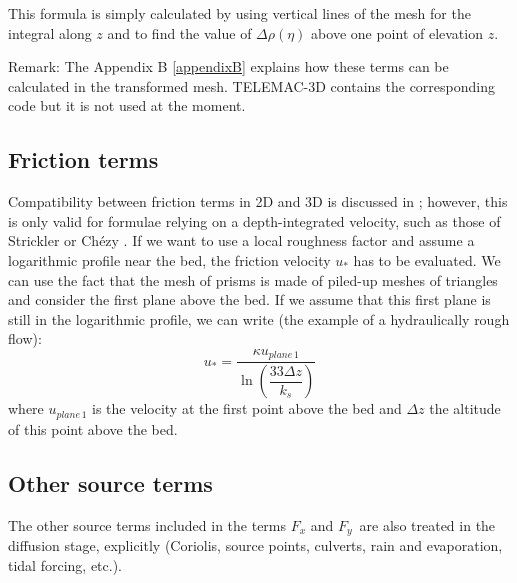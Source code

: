 This formula is simply calculated by using vertical lines of the mesh for the
integral along $z$ and to find the value of $\Delta\rho(\eta)$ above one point
of elevation $z$.

\begin{CommentBlock}{Remark:}
The Appendix B \ref{appendixB}
explains how these terms can be calculated in
the transformed mesh. TELEMAC-3D contains the corresponding code but it is not
used at the moment.
\end{CommentBlock}

\subsection{\label{friction3D}Friction terms%
%
}
Compatibility between friction terms in 2D and 3D is discussed in
\cite{hervouet007}; however, this is only valid for formulae relying on a
depth-integrated velocity, such as those of Strickler%
or Ch\'{e}zy%
%
. If we want to use a local roughness factor and assume a logarithmic profile
near the bed, the friction velocity $u_{\ast}$ has to be evaluated. We can
use the fact that the mesh of prisms is made of piled-up meshes of triangles
and consider the first plane above the bed. If we assume that this first
plane is still in the logarithmic profile, we can write (the example of a
hydraulically rough flow):%
%
%
\begin{equation}
u_*=\dfrac{\kappa u_{plane\,1}}{\ln\left(\dfrac{33\Delta z}{k_{s}}\right)}%
\end{equation}
where $u_{plane\,1}$ is the velocity at the first point above the bed and
$\Delta z$ the altitude of this point above the bed.

\subsection{\label{calcul termes sources 3D}Other source terms}

The other source terms included in the terms $F_{x}$ and $F_{y}$\ are also
treated in the diffusion stage, explicitly (Coriolis, source points, culverts,
rain and evaporation, tidal forcing, etc.).

